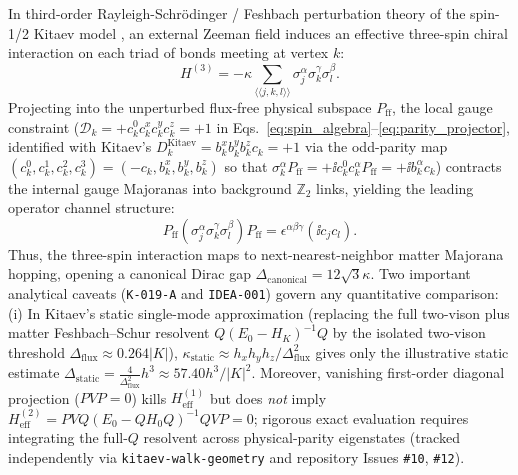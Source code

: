 \begin{remark}
In third-order Rayleigh-Schr\"odinger / Feshbach perturbation theory of the spin-1/2 Kitaev model \cite{Kitaev2006}, an external Zeeman field induces an effective three-spin chiral interaction on each triad of bonds meeting at vertex $k$:
\begin{equation}
\label{eq:kitaev_kappa_exact}
H^{(3)} = -\kappa \sum_{\langle\langle j, k, l \rangle\rangle} \sigma_j^\alpha \sigma_k^\gamma \sigma_l^\beta.
\end{equation}
Projecting into the unperturbed flux-free physical subspace $P_{\mathrm{ff}}$, the local gauge constraint ($\mathcal{D}_k = +c_k^0 c_k^x c_k^y c_k^z = +1$ in Eqs.~\eqref{eq:spin_algebra}--\eqref{eq:parity_projector}, identified with Kitaev's $D_k^{\mathrm{Kitaev}} = b_k^x b_k^y b_k^z c_k = +1$ via the odd-parity map $(c_k^0, c_k^1, c_k^2, c_k^3) = (-c_k, b_k^x, b_k^y, b_k^z)$ so that $\sigma_k^\alpha P_{\mathrm{ff}} = +\ii c_k^0 c_k^\alpha P_{\mathrm{ff}} = +\ii b_k^\alpha c_k$) contracts the internal gauge Majoranas into background $\mathbb{Z}_2$ links, yielding the leading operator channel structure:
\begin{equation}
\label{eq:three_spin_majorana_projection}
P_{\mathrm{ff}} \left(\sigma_j^\alpha \sigma_k^\gamma \sigma_l^\beta\right) P_{\mathrm{ff}} = \epsilon^{\alpha\beta\gamma} (\ii c_j c_l).
\end{equation}
Thus, the three-spin interaction maps to next-nearest-neighbor matter Majorana hopping, opening a canonical Dirac gap $\Delta_{\mathrm{canonical}} = 12\sqrt{3}\kappa$. Two important analytical caveats (\texttt{K-019-A} and \texttt{IDEA-001}) govern any quantitative comparison:
(i) In Kitaev's static single-mode approximation \cite{Kitaev2006} (replacing the full two-vison plus matter Feshbach--Schur resolvent $Q(E_0 - H_K)^{-1}Q$ by the isolated two-vison threshold $\Delta_{\mathrm{flux}} \approx 0.264 |K|$), $\kappa_{\mathrm{static}} \approx h_x h_y h_z / \Delta_{\mathrm{flux}}^2$ gives only the illustrative static estimate $\Delta_{\mathrm{static}} = \frac{4}{\Delta_{\mathrm{flux}}^2} h^3 \approx 57.40 h^3/|K|^2$. Moreover, vanishing first-order diagonal projection ($PVP = 0$) kills $H_{\mathrm{eff}}^{(1)}$ but does \emph{not} imply $H_{\mathrm{eff}}^{(2)} = PV Q(E_0 - Q H_0 Q)^{-1} Q VP = 0$; rigorous exact evaluation requires integrating the full-$Q$ resolvent across physical-parity eigenstates (tracked independently via \texttt{kitaev-walk-geometry} and repository Issues \texttt{\#10}, \texttt{\#12}).


\end{remark}

